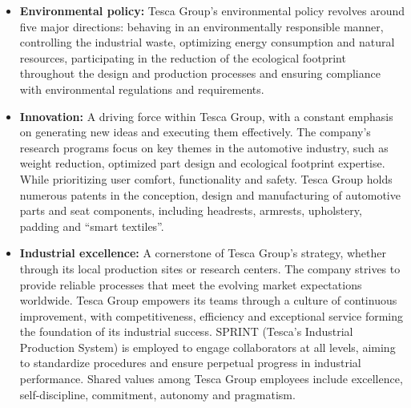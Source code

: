 \begin{itemize}

    \item \textbf{Environmental policy:} Tesca Group's environmental policy revolves around five major directions: behaving in an environmentally responsible manner, controlling the industrial waste, optimizing energy consumption and natural resources, participating in the reduction of the ecological footprint throughout the design and production processes and ensuring compliance with environmental regulations and requirements\cite{tesca_official}.

\end{itemize}


\begin{itemize}

    \item \textbf{Innovation:} A driving force within Tesca Group, with a constant emphasis on generating new ideas and executing them effectively. The company's research programs focus on key themes in the automotive industry, such as weight reduction, optimized part design and ecological footprint expertise. While prioritizing user comfort, functionality and safety. Tesca Group holds numerous patents in the conception, design and manufacturing of automotive parts and seat components, including headrests, armrests, upholstery, padding and ``smart textiles''\cite{tesca_official}.

\end{itemize}


\begin{itemize}

    \item \textbf{Industrial excellence:} A cornerstone of Tesca Group's strategy, whether through its local production sites or research centers. The company strives to provide reliable processes that meet the evolving market expectations worldwide. Tesca Group empowers its teams through a culture of continuous improvement, with competitiveness, efficiency and exceptional service forming the foundation of its industrial success. SPRINT (Tesca's Industrial Production System) is employed to engage collaborators at all levels, aiming to standardize procedures and ensure perpetual progress in industrial performance. Shared values among Tesca Group employees include excellence, self-discipline, commitment, autonomy and pragmatism\cite{tesca_official}.

\end{itemize}


